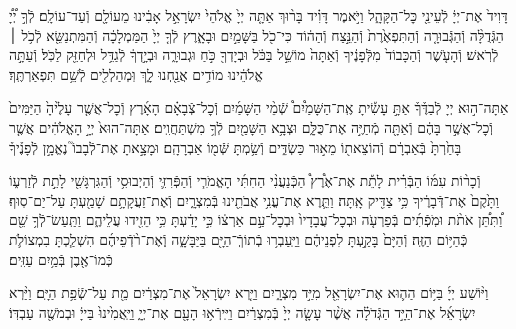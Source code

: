 \documentclass[twoside, openany, parskip=half, 11pt]{book}
\begin{document}
דָּוִיד֙ אֶת־יְיָ֔ לְֿעֵינֵ֖י כׇּל־הַקָּהָ֑ל וַיֹּ֣אמֶר דָּוִ֗יד בָּר֨וּךְ אַתָּ֤ה יְיָ֙ אֱלֹהֵי֙ יִשְׂרָאֵ֣ל אָבִ֔ינוּ מֵעוֹלָ֖ם וְֿעַד־עוֹלָֽם׃
לְֿךָ֣ יְ֠יָ֠ הַגְּֿדֻלָּ֨ה וְֿהַגְּֿבוּרָ֤ה וְֿהַתִּפְאֶ֙רֶת֙ וְֿהַנֵּ֣צַח וְֿהַה֔וֹד כִּי־כֹ֖ל בַּשָּׁמַ֣יִם וּבָאָ֑רֶץ לְֿךָ֤ יְיָ֙ הַמַּמְלָכָ֔ה וְֿהַמִּתְנַשֵּׂ֖א לְֿכֹ֥ל ׀ לְֿרֹֽאשׁ׃
וְֿהָעֹ֤שֶׁר וְֿהַכָּבוֹד֙ מִלְּֿפָנֶ֔יךָ וְֿאַתָּה֙ מוֹשֵׁ֣ל בַּכֹּ֔ל וּבְיָדְךָ֖ כֹּ֣חַ וּגְבוּרָ֑ה וּבְיָ֣דְךָ֔ לְֿגַדֵּ֥ל וּלְחַזֵּ֖ק לַכֹּֽל׃
וְֿעַתָּ֣ה אֱלֹהֵ֔ינוּ מוֹדִ֥ים אֲנַ֖חְנוּ לָ֑ךְ וּֽמְהַלְלִ֖ים לְֿשֵׁ֥ם תִּפְאַרְתֶּֽךָ׃





אַתָּה־ה֣וּא
יְיָ לְֿבַדֶּ֒ךָ֒ אַתָּ֣ עָשִׂ֡יתָ אֶֽת־הַשָּׁמַ֩יִם֩ שְֿׁמֵ֨י הַשָּׁמַ֜יִם וְֿכׇל־צְֿבָאָ֗ם הָאָ֜רֶץ וְֿכׇל־אֲשֶׁ֤ר עָלֶ֙יהָ֙ הַיַּמִּים֙ וְֿכׇל־אֲשֶׁ֣ר בָּהֶ֔ם וְֿאַתָּ֖ה מְֿחַיֶּ֣ה אֶת־כֻּלָּ֑ם וּצְבָ֥א הַשָּׁמַ֖יִם לְֿךָ֥ מִשְׁתַּחֲוִֽים׃
אַתָּה־הוּא֙ יְיָ֣ הָאֱלֹהִ֔ים אֲשֶׁ֤ר בָּחַ֙רְתָּ֙ בְּֿאַבְרָ֔ם וְֿהוֹצֵאת֖וֹ מֵא֣וּר כַּשְׂדִּ֑ים וְֿשַׂ֥מְתָּ שְּֿׁמ֖וֹ אַבְרָהָֽם׃ וּמָצָ֣אתָ אֶת־לְֿבָבוֹ֮ נֶאֱמָ֣ן לְֿפָנֶ֒יךָ֒

וְֿכָר֨וֹת עִמּ֜וֹ הַבְּֿרִ֗ית לָתֵ֡ת אֶת־אֶ֩רֶץ֩ הַכְּֿנַעֲנִ֨י הַחִתִּ֜י הָאֱמֹרִ֧י וְֿהַפְּֿרִזִּ֛י וְֿהַיְבוּסִ֥י וְֿהַגִּרְגָּשִׁ֖י לָתֵ֣ת לְֿזַרְע֑וֹ וַתָּ֙קֶם֙ אֶת־דְּֿבָרֶ֔יךָ כִּ֥י צַדִּ֖יק אָֽתָּה׃ וַתֵּ֛רֶא אֶת־עֳנִ֥י אֲבֹתֵ֖ינוּ בְּֿמִצְרָ֑יִם וְֿאֶת־זַעֲקָתָ֥ם שָׁמַ֖עְתָּ עַל־יַם־סֽוּף׃ וַ֠תִּתֵּ֠ן אֹתֹ֨ת וּמֹֽפְֿתִ֜ים בְּֿפַרְעֹ֤ה וּבְכׇל־עֲבָדָיו֙ וּבְכׇל־עַ֣ם אַרְצ֔וֹ כִּ֣י יָדַ֔עְתָּ כִּ֥י הֵזִ֖ידוּ עֲלֵיהֶ֑ם וַתַּֽעַשׂ־לְֿךָ֥ שֵׁ֖ם כְּֿהַיּ֥וֹם הַזֶּֽה׃
וְֿהַיָּם֙ בָּקַ֣עְתָּ לִפְנֵיהֶ֔ם וַיַּֽעַבְר֥וּ בְֿתוֹךְֿ־הַיָּ֖ם בַּיַּבָּשָׁ֑ה וְֽֿאֶת־רֹ֨דְֿפֵיהֶ֜ם הִשְׁלַ֧כְתָּ בִמְצוֹלֹ֛ת כְּֿמוֹ־אֶ֖בֶן בְּֿמַ֥יִם עַזִּֽים׃

וַיּ֨וֹשַׁע
יְיָ֜ בַּיּ֥וֹם הַה֛וּא אֶת־יִשְׂרָאֵ֖ל מִיַּ֣ד מִצְרָ֑יִם וַיַּ֤רְא יִשְׂרָאֵל֙ אֶת־מִצְרַ֔יִם מֵ֖ת עַל־שְֿׂפַ֥ת הַיָּֽם׃
וַיַּ֨רְא יִשְׂרָאֵ֜ל אֶת־הַיָּ֣ד הַגְּֿדֹלָ֗ה אֲשֶׁ֨ר עָשָׂ֤ה יְיָ֙ בְּֿמִצְרַ֔יִם וַיִּֽירְֿא֥וּ הָעָ֖ם אֶת־יְיָ֑ וַיַּֽאֲמִ֙ינוּ֙ בַּייָ֔ וּבְמֹשֶׁ֖ה עַבְדּֽוֹ׃
\end{document}
